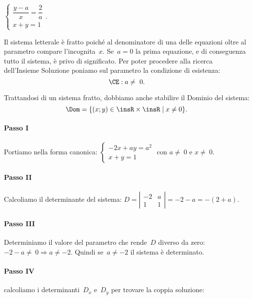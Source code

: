 \begin{exrig}
 \vspace{1.10ex}
 \begin{esempio}
$\left\{\begin{array}{l}\dfrac{y-a}{x}=\dfrac{2}{a}\\{x+y=1}\end{array}\right..$

Il sistema letterale è fratto poiché al denominatore di una delle equazioni oltre al parametro
compare l'incognita~$x$. Se~$a=0$ la prima equazione, e di conseguenza tutto il sistema, è
privo di significato. Per poter procedere alla ricerca
dell'Insieme Soluzione poniamo sul
parametro la condizione di esistenza:
\begin{equation}
\label{eq:19.1}
\CE: a\neq~0.
\end{equation}

Trattandosi di un sistema fratto, dobbiamo anche stabilire il Dominio del sistema:
\begin{equation}
 \label{eq:19.2}
\Dom=\{(x;y)\in \insR\times \insR\mid x\neq 0\}.
 \end{equation}

\paragraph{Passo I} Portiamo nella forma canonica:
$\left\{\begin{array}{l}-2x+ay=a^{2}\\x+y=1\end{array}\right.\text{ con }a\neq~0\text{ e }x\neq~0$.
\paragraph{Passo II} Calcoliamo il determinante del sistema:
$D=\left|\begin{array}{cc}{-2}&{a}\\{1}&{1}\end{array}\right|=-2-a=-(2+a)$.

\paragraph{Passo III} Determiniamo il valore del parametro che
rende~$D$ diverso da zero:~$-2-a\neq~0\Rightarrow a\neq -2$.
Quindi se~$a\neq -2$ il sistema è determinato.

\paragraph{Passo IV} calcoliamo i determinanti~$D_{x}$
e~$D_{y}$ per trovare la coppia soluzione:


\end{esempio}
\end{exrig}

